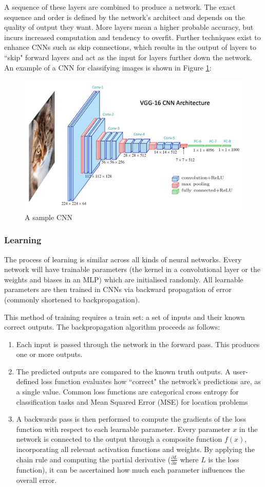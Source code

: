 A sequence of these layers are combined to produce a network. The exact sequence and order is defined by the network's architect and depends on the quality of output they want. More layers mean a higher probable accuracy, but incurs increased computation and tendency to overfit. Further techniques exist to enhance CNNs such as skip connections, which results in the output of layers to ``skip" forward layers and act as the input for layers further down the network. An example of a CNN for classifying images is shown in Figure \ref{fig:sample-cnn}:

\begin{figure}[H]
    \centering
    \includegraphics[width=0.5\linewidth]{dissertation//figures/sample-cnn.png}
    \caption{A sample CNN\cite{kromydas2023convolutional}}
    \label{fig:sample-cnn}
\end{figure}

\subsubsection{Learning}

The process of learning is similar across all kinds of neural networks. Every network will have trainable parameters (the kernel in a convolutional layer or the weights and biases in an MLP) which are initialised randomly. All learnable parameters are then trained in CNNs via backward propagation of error (commonly shortened to backpropagation)\cite{rojas2013neural}.

This method of training requires a train set: a set of inputs and their known correct outputs. The backpropagation algorithm proceeds as follows:

\begin{enumerate}
    \item Each input is passed through the network in the forward pass. This produces one or more outputs.
    \item The predicted outputs are compared to the known truth outputs. A user-defined loss function evaluates how ``correct" the network's predictions are, as a single value. Common loss functions are categorical cross entropy for classification tasks and Mean Squared Error (MSE) for location problems\cite{begmann-backpropagation}
    \item A backwards pass is then performed to compute the gradients of the loss function with respect to each learnable parameter. Every parameter $x$ in the network is connected to the output through a composite function $f(x)$, incorporating all relevant activation functions and weights. By applying the chain rule and computing the partial derivative ($\frac{\partial L}{\partial x}$ where $L$ is the loss function), it can be ascertained how much each parameter influences the overall error.
\end{enumerate}

